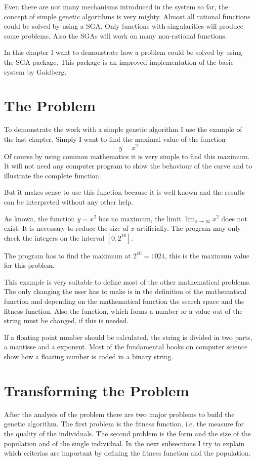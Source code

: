 Even there are not many mechanisms introduced in the system so far, the concept
of simple genetic algorithms is very mighty. Almost all rational functions
could be solved by using a SGA. Only functions with singularities will produce 
some problems. Also the SGAs will work on many non-rational functions.

In this chapter I want to demonstrate how a problem could be solved by using
the SGA package. This package is an improved implementation of the basic system
by Goldberg\cite{Gol89}.
\section{The Problem}
To demonstrate the work with a simple genetic algorithm I use the example of the
last chapter. Simply I want to find the maximal value of the function
$$y = x^2$$
Of course by using common mathematics it is very simple to find this maximum.
It will not need any computer program to show the behaviour of the curve and
to illustrate the complete function.

But it makes sense to use this function because it is well known and the results
can be interpreted without any other help.

As known, the function $y = x^2$ has no maximum, the limit $\lim_{x \to \infty} x^2$
does not exist. It is necessary to reduce the size of $x$ artificially. The program
may only check the integers on the interval $[0,2^{10}]$.

The program has to find the maximum at $2^{10} = 1024$, this is the maximum value
for this problem.

This example is very suitable to define most of the other mathematical problems.
The only changing the user has to make is in the definition of the mathematical
function and depending on the mathematical function the search space and the
fitness function. Also the function, which forms a number or a value out of the
string must be changed, if this is needed.

If a floating point number should be calculated, the string is divided in two
parts, a mantisse and a exponent. Most of the fundamental books on computer 
science show how a floating number is coded in a binary string.
\section{Transforming the Problem}
After the analysis of the problem there are two major problems to build the
genetic algorithm. The first problem is the fitness function, i.e. the measure
for the quality of the individuals. The second problem is the form and the size
of the population and of the single individual. In the next subsections I try
to explain which criterias are important by defining the fitness function and the
population.
